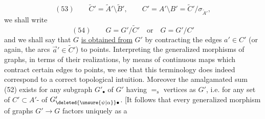 \[
(53)\qquad\widetilde C'=\widetilde A'\setminus\widetilde B',\qquad C'=A'\setminus B'=\widetilde C'/\sigma_{\widetilde A'},
\]
we shall write
\[
(54)\qquad G=G'/\widetilde C'\quad\text{or}\quad G=G'/C'
\]
and we shall say that $G$ \uline{is obtained from} $G'$ by contracting the edges $a'\in C'$ (or again, the arcs $\vec a'\in\widetilde C'$) to points. Interpreting the generalized morphisms of graphs, in terms of their  realizations, by means of continuous maps which contract  certain edges to points, we see that this terminology does indeed correspond to a correct topological intuition. Moreover the amalgamated sum (52) exists for any subgraph $G'_\bullet$ of $G'$ having $=_{\mathrm s}$ vertices as $G'$, i.e. for any set of  $C'\subset A'$- of $G'_{\deleted{\unsure{\psi|\alpha}}\bullet}$. [It follows that every generalized morphism of graphs $G'\longrightarrow G$ factors uniquely as a
